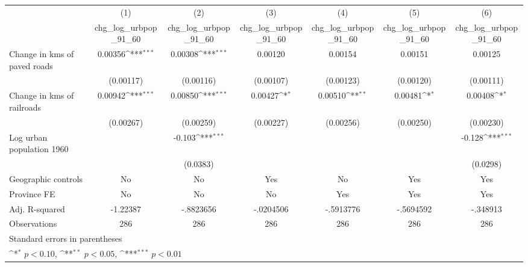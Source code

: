 {
\def\sym#1{\ifmmode^{#1}\else\(^{#1}\)\fi}
\begin{tabular}{l*{6}{c}}
\hline\hline
                    &\multicolumn{1}{c}{(1)}&\multicolumn{1}{c}{(2)}&\multicolumn{1}{c}{(3)}&\multicolumn{1}{c}{(4)}&\multicolumn{1}{c}{(5)}&\multicolumn{1}{c}{(6)}\\
                    &\multicolumn{1}{c}{chg\_log\_urbpop\_91\_60}&\multicolumn{1}{c}{chg\_log\_urbpop\_91\_60}&\multicolumn{1}{c}{chg\_log\_urbpop\_91\_60}&\multicolumn{1}{c}{chg\_log\_urbpop\_91\_60}&\multicolumn{1}{c}{chg\_log\_urbpop\_91\_60}&\multicolumn{1}{c}{chg\_log\_urbpop\_91\_60}\\
\hline
Change in kms of paved roads&     0.00356\sym{***}&     0.00308\sym{***}&     0.00120         &     0.00154         &     0.00151         &     0.00125         \\
                    &   (0.00117)         &   (0.00116)         &   (0.00107)         &   (0.00123)         &   (0.00120)         &   (0.00111)         \\
[1em]
Change in kms of railroads&     0.00942\sym{***}&     0.00850\sym{***}&     0.00427\sym{*}  &     0.00510\sym{**} &     0.00481\sym{*}  &     0.00408\sym{*}  \\
                    &   (0.00267)         &   (0.00259)         &   (0.00227)         &   (0.00256)         &   (0.00250)         &   (0.00230)         \\
[1em]
Log urban population 1960&                     &      -0.103\sym{***}&                     &                     &                     &      -0.128\sym{***}\\
                    &                     &    (0.0383)         &                     &                     &                     &    (0.0298)         \\
\hline
Geographic controls &          No         &          No         &         Yes         &          No         &         Yes         &         Yes         \\
Province FE         &          No         &          No         &          No         &         Yes         &         Yes         &         Yes         \\
Adj. R-squared      &    -1.22387         &   -.8823656         &   -.0204506         &   -.5913776         &   -.5694592         &    -.348913         \\
Observations        &         286         &         286         &         286         &         286         &         286         &         286         \\
\hline\hline
\multicolumn{7}{l}{\footnotesize Standard errors in parentheses}\\
\multicolumn{7}{l}{\footnotesize \sym{*} \(p<0.10\), \sym{**} \(p<0.05\), \sym{***} \(p<0.01\)}\\
\end{tabular}
}
